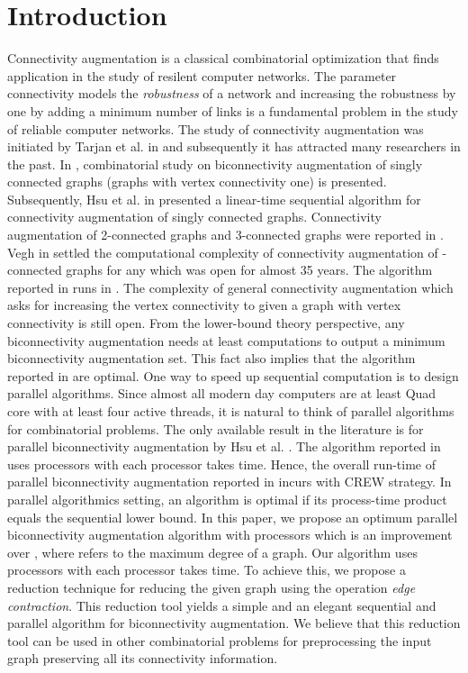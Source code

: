 \documentclass[runningheads]{llncs}
\begin{document}
\section{Introduction}
Connectivity augmentation is a classical combinatorial optimization that finds application in the study of resilent computer networks.  The parameter connectivity models the {\em robustness} of a network and increasing the robustness by one by adding a minimum number of links is a fundamental problem in the study of reliable computer networks.  The study of connectivity augmentation was initiated by Tarjan et al. in \cite{tarjan} and subsequently it has attracted many researchers in the past.   In \cite{tarjan}, combinatorial study on biconnectivity augmentation of singly connected graphs (graphs with vertex connectivity one) is presented.  Subsequently, Hsu et al. in \cite{hsu} presented a linear-time sequential algorithm for connectivity augmentation of singly connected graphs.  Connectivity augmentation of 2-connected graphs and 3-connected graphs were reported in \cite{a,b}.  Vegh in \cite{vegh} settled the computational complexity of connectivity augmentation of -connected graphs for any  which was open for almost 35 years.   The algorithm reported in \cite{vegh} runs in .  The complexity of general connectivity augmentation which asks for increasing the vertex connectivity to  given a graph with vertex connectivity  is still open.  From the lower-bound theory perspective, any biconnectivity augmentation needs at least  computations to output a minimum biconnectivity augmentation set.  This fact also implies that the algorithm reported in \cite{tarjan,hsu} are optimal.  One way to speed up sequential computation is to design parallel algorithms.   Since almost all modern day computers are at least Quad core with at least four active threads, it is natural to think of parallel algorithms for combinatorial problems.  The only available result in the literature is for parallel biconnectivity augmentation by Hsu et al. \cite{hsu}.  The algorithm reported in \cite{hsu} uses  processors with each processor takes  time.  Hence, the overall run-time of parallel biconnectivity augmentation reported in \cite{hsu} incurs  with CREW strategy.   In parallel algorithmics setting, an algorithm is optimal if its process-time product equals the sequential lower bound.   In this paper, we propose an optimum parallel biconnectivity augmentation algorithm with  processors which is an improvement over \cite{hsu}, where  refers to the maximum degree of a graph.  Our algorithm uses  processors with each processor takes  time.  To achieve this, we propose a reduction technique for reducing the given graph using the operation {\em edge contraction}.  This reduction tool yields a simple and an elegant sequential and parallel algorithm for biconnectivity augmentation.  We believe that this reduction tool can be used in other combinatorial problems for preprocessing the input graph preserving all its connectivity information.       \\ \\
\end{document}
